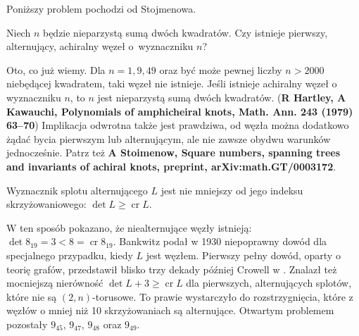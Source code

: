 Poniższy problem pochodzi od Stojmenowa.

\begin{conjecture}
    Niech $n$ będzie nieparzystą sumą dwóch kwadratów.
    Czy istnieje pierwszy, alternujący, achiralny węzeł o~wyznaczniku $n$?
\end{conjecture}

Oto, co już wiemy.
Dla $n = 1, 9, 49$ oraz być może pewnej liczby $n > 2000$ niebędącej kwadratem, taki węzeł nie istnieje.
Jeśli istnieje achiralny węzeł o wyznaczniku $n$, to $n$ jest nieparzystą sumą dwóch kwadratów. (\textbf{\color{red}R Hartley, A Kawauchi, Polynomials of amphicheiral knots, Math. Ann. 243 (1979) 63–70})
Implikacja odwrotna także jest prawdziwa, od węzła można dodatkowo żądać bycia pierwszym lub alternującym, ale nie zawsze obydwu warunków jednocześnie.
Patrz też \textbf{\color{red}A Stoimenow, Square numbers, spanning trees and invariants of achiral knots, preprint, arXiv:math.GT/0003172}.

\begin{proposition} \label{prp:bankwitz}
    Wyznacznik splotu alternującego $L$ jest nie mniejszy od jego indeksu skrzyżowaniowego: $\det L \ge \operatorname{cr} L$.
\end{proposition}

W ten sposób pokazano, że niealternujące węzły istnieją: $\det 8_{19} = 3 < 8 = \operatorname{cr} 8_{19}$.
Bankwitz podał w 1930 niepoprawny dowód dla specjalnego przypadku, kiedy $L$ jest węzłem.
Pierwszy pełny dowód, oparty o teorię grafów, przedstawił blisko trzy dekady później Crowell w \cite{crowell59}.
Znalazł też mocniejszą nierówność $\det L + 3 \ge \operatorname{cr} L$ dla pierwszych, alternujących splotów, które nie są $(2, n)$-torusowe.
To prawie wystarczyło do rozstrzygnięcia, które z węzłów o mniej niż 10 skrzyżowaniach są alternujące.
Otwartym problemem pozostały $9_{45}$, $9_{47}$, $9_{48}$ oraz $9_{49}$.

